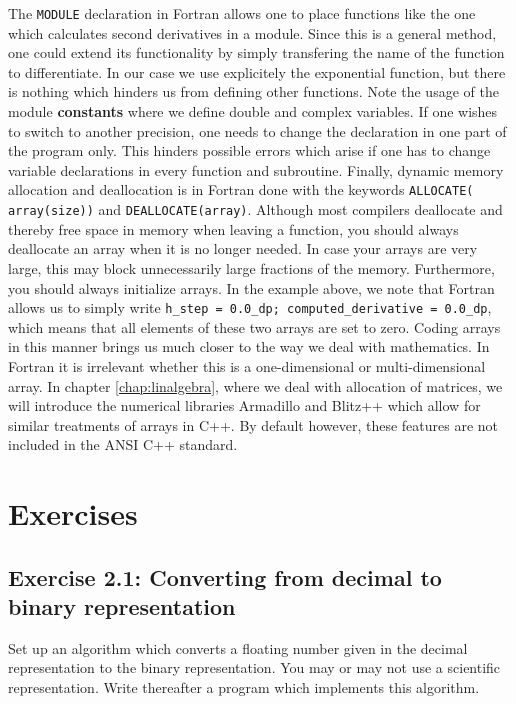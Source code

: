 The \verb?MODULE? declaration in Fortran allows one to place functions
like the one which calculates second derivatives in a module. Since this is a general method,
one could extend its functionality by simply transfering 
the name of the function to differentiate. In our case we use explicitely the exponential
function, but there is nothing which hinders us from defining other functions. 
Note the usage of the module {\bf constants} where we define double and complex variables.
If one wishes to switch to another precision, one needs to change the declaration
in one part of the program only. This hinders possible errors which arise if one has to change
variable declarations in every function and subroutine.   
Finally, dynamic memory allocation and deallocation is in Fortran 
done with the keywords \verb?ALLOCATE( array(size))? and \verb?DEALLOCATE(array)?.
Although most compilers deallocate and thereby free space in memory when leaving a
function, you should always deallocate an array when it is no longer needed. In case your arrays
are very large, this may block unnecessarily large fractions of the memory. 
Furthermore, you should always initialize arrays. In the example above, we note that Fortran allows
us to simply write \verb?h_step = 0.0_dp; computed_derivative = 0.0_dp?, which means that all
elements of these two arrays are set to zero.  Coding arrays in this manner brings us much
closer to the way we deal with mathematics. 
In Fortran  it is irrelevant whether this is a one-dimensional or multi-dimensional array.
In chapter \ref{chap:linalgebra}, where we deal with
allocation of matrices, we will introduce the  numerical libraries Armadillo and 
Blitz++ which allow for similar
treatments of arrays in C++. By default however, these features are not included in 
the ANSI C++ standard. 







\section{Exercises}

\subsection*{Exercise 2.1: Converting from decimal to binary representation}

Set up an algorithm
which converts a floating number given in the decimal representation 
to the binary representation. You may or may not use a scientific representation.
Write thereafter a program which implements this algorithm. 



